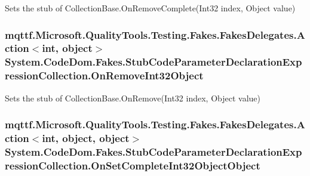 Sets the stub of Collection\-Base.\-On\-Remove\-Complete(\-Int32 index, Object value)

\hypertarget{class_system_1_1_code_dom_1_1_fakes_1_1_stub_code_parameter_declaration_expression_collection_ac664d1b55cee41fdc47d308507672634}{
\subsubsection[{On\-Remove\-Int32\-Object}]{\setlength{\rightskip}{0pt plus 5cm}mqttf.\-Microsoft.\-Quality\-Tools.\-Testing.\-Fakes.\-Fakes\-Delegates.\-Action$<$int, object$>$ System.\-Code\-Dom.\-Fakes.\-Stub\-Code\-Parameter\-Declaration\-Expression\-Collection.\-On\-Remove\-Int32\-Object}}\label{class_system_1_1_code_dom_1_1_fakes_1_1_stub_code_parameter_declaration_expression_collection_ac664d1b55cee41fdc47d308507672634}


Sets the stub of Collection\-Base.\-On\-Remove(\-Int32 index, Object value)

\hypertarget{class_system_1_1_code_dom_1_1_fakes_1_1_stub_code_parameter_declaration_expression_collection_ab2823b74d633b95434bc7c399d736cab}{
\subsubsection[{On\-Set\-Complete\-Int32\-Object\-Object}]{\setlength{\rightskip}{0pt plus 5cm}mqttf.\-Microsoft.\-Quality\-Tools.\-Testing.\-Fakes.\-Fakes\-Delegates.\-Action$<$int, object, object$>$ System.\-Code\-Dom.\-Fakes.\-Stub\-Code\-Parameter\-Declaration\-Expression\-Collection.\-On\-Set\-Complete\-Int32\-Object\-Object}}\label{class_system_1_1_code_dom_1_1_fakes_1_1_stub_code_parameter_declaration_expression_collection_ab2823b74d633b95434bc7c399d736cab}


